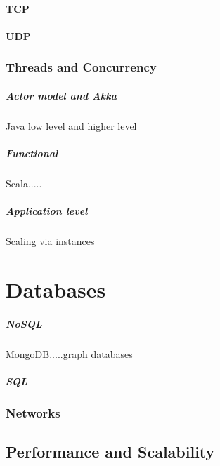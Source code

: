 \documentclass[a4paper, 11pt]{book}
\begin{document}
    \subsubsection{TCP}

    \subsubsection{UDP}

    \subsection{Threads and Concurrency}

    \paragraph{Actor model and Akka}
    Java low level and higher level

    \paragraph{Functional}
    Scala.....

    \paragraph{Application level}
    Scaling via instances


    \chapter{Databases}

    \paragraph{NoSQL}
    MongoDB.....graph databases

    \paragraph{SQL}

    \subsection{Networks}


    \section{Performance and Scalability}
\end{document}
